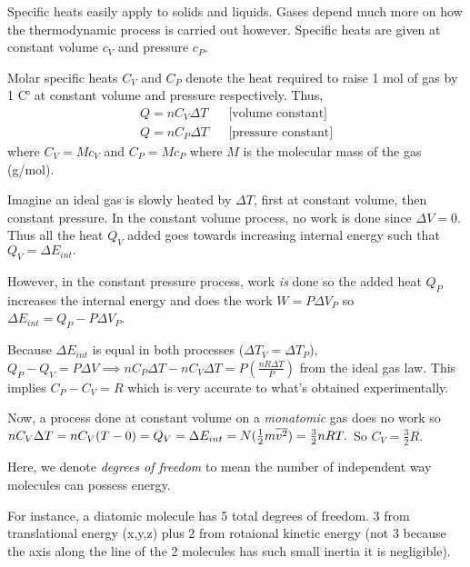 \begin{remark}
    Specific heats easily apply to solids and liquids. Gases depend much more on how the thermodynamic process is carried out however. Specific heats are given at constant volume $c_V$ and pressure $c_P$.
\end{remark}
\begin{definition}
    Molar specific heats $C_V$ and $C_P$ denote the heat required to raise 1 mol of gas by 1 C$\operatorname{\!^{\circ}\!}$ at constant volume and pressure respectively. Thus,
    \begin{align*}
        Q = nC_V\Delta T && \text{[volume constant]} \\
        Q = nC_P\Delta T && \text{[pressure constant]}
    \end{align*}
    where $C_V = Mc_V$ and $C_P = Mc_P$ where $M$ is the molecular mass of the gas (g/mol).
\end{definition}
\begin{remark}
    Imagine an ideal gas is slowly heated by $\Delta T$, first at constant volume, then constant pressure. In the constant volume process, no work is done since $\Delta V = 0.$ Thus all the heat $Q_V$ added goes towards increasing internal energy such that $Q_V = \Delta E_{int}.$
    
    However, in the constant pressure process, work \emph{is} done so the added heat $Q_P$ increases the internal energy and does the work $W = P\Delta V_P$ so $\Delta E_{int} = Q_P - P\Delta V_P$. 
    
    Because $\Delta E_{int}$ is equal in both processes ($\Delta T_V = \Delta T_P$), $Q_P - Q_V = P\Delta V \implies nC_P\Delta T - nC_V\Delta T = P(\frac{nR\Delta T}{P})$ from the ideal gas law. This implies $C_P-C_V = R$ which is very accurate to what's obtained experimentally.
\end{remark}
\begin{remark}
    Now, a process done at constant volume on a \emph{monatomic} gas does no work so $nC_V\Delta T = nC_V(T - 0) = Q_V = \Delta E_{int} = N(\frac{1}{2}m\overline{v^2}) = \frac{3}{2}nRT.$ So $C_V = \frac{3}{2}R.$  
\end{remark}
\begin{definition}
    Here, we denote \emph{degrees of freedom} to mean the number of independent way molecules can possess energy.
\end{definition}
\begin{example}
    For instance, a diatomic molecule has 5 total degrees of freedom. 3 from translational energy (x,y,z) plus 2 from rotaional kinetic energy (not 3 because the axis along the line of the 2 molecules has such small inertia it is negligible).
\end{example}
